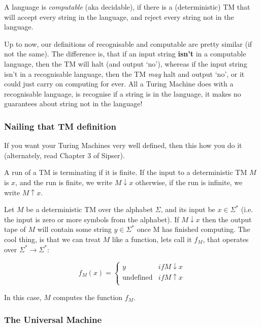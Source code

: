 A language is \textit{computable} (aka decidable), if there is a (deterministic)
TM that will accept every string in the language, and reject every string not in
the language.

Up to now, our definitions of recognisable and computable are pretty similar (if
not the same). The difference is, that if an input string \textbf{isn't} in a
computable language, then the TM will halt (and output `no'), whereas if the
input string isn't in a recognisable language, then the TM \textit{may} halt and
output `no', or it could just carry on computing for ever. All a Turing Machine
does with a recognisable language, is recognise if a string is in the language,
it makes no guarantees about string not in the language!

\subsubsection{Nailing that TM definition}

If you want your Turing Machines very well defined, then this how you do it
(alternately, read Chapter 3 of Sipser).


A run of a TM is terminating if it is finite. If the input to a deterministic TM
$M$ is $x$, and the run is finite, we write $M \downarrow x$ otherwise, if the
run is infinite, we write $M \uparrow x$.

Let $M$ be a deterministic TM over the alphabet $\Sigma$, and its input be $x
\in \Sigma^*$ (i.e. the input is zero or more symbols from the alphabet). If $M
\downarrow x$ then the output tape of $M$ will contain some string $y \in
\Sigma^*$ once M has finished computing. The cool thing, is that we can treat
$M$ like a function, lets call it $f_M$, that operates over $\Sigma^*
\rightarrow \Sigma^*$:

\[
  f_M(x) = \begin{cases}
       y & if M \downarrow x\\
       \text{undefined} & if M \uparrow x\\
     \end{cases}
\]

In this case, $M$ computes the function $f_M$.

\subsubsection{The Universal Machine}

